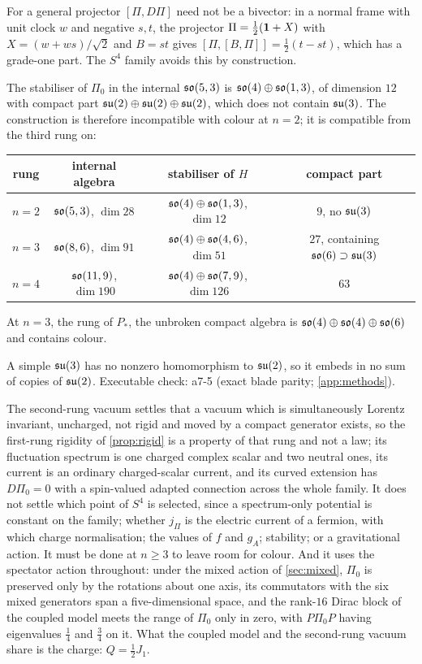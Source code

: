 For a general projector $[\Pi,D\Pi]$ need not be a bivector: in a normal frame with unit clock $w$ and negative $s,t$, the projector $\Pi=\tfrac12(\mathbf 1+X)$ with $X=(w+ws)/\sqrt2$
and $B=st$ gives $[\Pi,[B,\Pi]]=\tfrac12(t-st)$, which has a grade-one part. The $S^4$ family avoids this by construction.

\begin{proposition}
\label{prop:towermatter}
The stabiliser of $\Pi_0$ in the internal $\mathfrak{so}(5,3)$ is $\mathfrak{so}(4)\oplus\mathfrak{so}(1,3)$, of dimension $12$ with compact part $\mathfrak{su}(2)\oplus\mathfrak{su}(2)\oplus\mathfrak{su}(2)$, which does not contain $\mathfrak{su}(3)$. The
construction is therefore incompatible with colour at $n=2$; it is compatible from the third rung on:
\begin{center}
\small
\begin{tabular}{@{}cccc@{}}
\toprule
rung & internal algebra & stabiliser of $H$ & compact part\\
\midrule
$n=2$ & $\mathfrak{so}(5,3)$, $\dim28$ & $\mathfrak{so}(4)\oplus\mathfrak{so}(1,3)$, $\dim12$ & $9$, no $\mathfrak{su}(3)$\\
$n=3$ & $\mathfrak{so}(8,6)$, $\dim91$ & $\mathfrak{so}(4)\oplus\mathfrak{so}(4,6)$, $\dim51$ & $27$, containing $\mathfrak{so}(6)\supset\mathfrak{su}(3)$\\
$n=4$ & $\mathfrak{so}(11,9)$, $\dim190$ & $\mathfrak{so}(4)\oplus\mathfrak{so}(7,9)$, $\dim126$ & $63$\\
\bottomrule
\end{tabular}
\end{center}
At $n=3$, the rung of $P_*$, the unbroken compact algebra is $\mathfrak{so}(4)\oplus\mathfrak{so}(4)\oplus\mathfrak{so}(6)$ and contains colour.
\end{proposition}

\noindent A simple $\mathfrak{su}(3)$ has no nonzero homomorphism to $\mathfrak{su}(2)$, so it embeds in no sum of copies of $\mathfrak{su}(2)$. Executable check: a7-5 (exact blade parity;
\cref{app:methods}).

The second-rung vacuum settles that a vacuum which is simultaneously Lorentz invariant, uncharged, not rigid and moved by a compact generator exists, so the first-rung
rigidity of \cref{prop:rigid} is a property of that rung and not a law; its fluctuation spectrum is one charged complex scalar and two neutral ones, its current is an
ordinary charged-scalar current, and its curved extension has $D\Pi_0=0$ with a spin-valued adapted connection across the whole family. It does not settle which point
of $S^4$ is selected, since a spectrum-only potential is constant on the family; whether $j_\Pi$ is the electric current of a fermion, with which charge normalisation;
the values of $f$ and $g_A$; stability; or a gravitational action. It must be done at $n\ge3$ to leave room for colour. And it uses the spectator action throughout:
under the mixed action of \cref{sec:mixed}, $\Pi_0$ is preserved only by the rotations about one axis, its commutators with the six mixed generators span a
five-dimensional space, and the rank-$16$ Dirac block of the coupled model meets the range of $\Pi_0$ only in zero, with $P\Pi_0P$ having eigenvalues $\tfrac14$ and $\tfrac34$
on it. What the coupled model and the second-rung vacuum share is the charge: $Q=\tfrac12J_1$.

